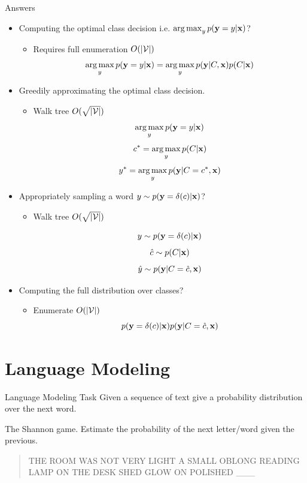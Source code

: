 \documentclass{beamer}
\begin{document}
\begin{frame}[allowframebreaks]{Answers}
  \begin{itemize}
  \item Computing the optimal class decision i.e. $\argmax_{y} p(\boldy = y| \boldx)$?
    \air 

    \begin{itemize}
    \item Requires full enumeration $O(|\mathcal{V}|)$ 
      \[\argmax_{y} p(\boldy =y | \boldx) = \argmax_{y} p(\boldy | C, \boldx) p(C | \boldx) \]
    \end{itemize}

  \item Greedily approximating the optimal class decision.
    \begin{itemize}
    \item Walk tree $O(\sqrt{|\mathcal{V}|})$ 
      \[\argmax_{y} p(\boldy =y | \boldx)  \]
      \[c^* = \argmax_{y}  p(C | \boldx)\]
      \[y^* = \argmax_{y}  p(\boldy | C=c^*, \boldx)\]
    \end{itemize}
   \air 

  \item Appropriately sampling a word $y \sim p(\mathbf{y} =\delta(c) | \mathbf{x})$?
    \begin{itemize}
    \item Walk tree $O(\sqrt{|\mathcal{V}|})$ 

      \[y \sim p(\mathbf{y} =\delta(c) | \mathbf{x})\] 
      \[\hat{c} \sim   p(C | \mathbf{x})\]
      \[\hat{y} \sim   p(\mathbf{y} | C=\hat{c}, \mathbf{x})\]
    \end{itemize}


  \item Computing the full distribution over classes?
    \begin{itemize}
    \item  Enumerate $O(|\mathcal{V}|)$ 
      \[  p(\mathbf{y} =\delta(c) | \mathbf{x}) p(\mathbf{y} | C=\hat{c}, \mathbf{x}) \] 
    \end{itemize}

  \end{itemize}
\end{frame}

\section{Language Modeling}

\begin{frame}{Language Modeling Task}
  Given a sequence of text give a probability distribution 
  over the next word. 

\air

  The Shannon game. Estimate the probability of the next letter/word
  given the previous.

  \begin{quote}
    THE ROOM WAS NOT VERY LIGHT A SMALL OBLONG READING LAMP ON THE
    DESK SHED GLOW ON POLISHED \_\_\_\
  \end{quote}


\end{frame}
\end{document}

